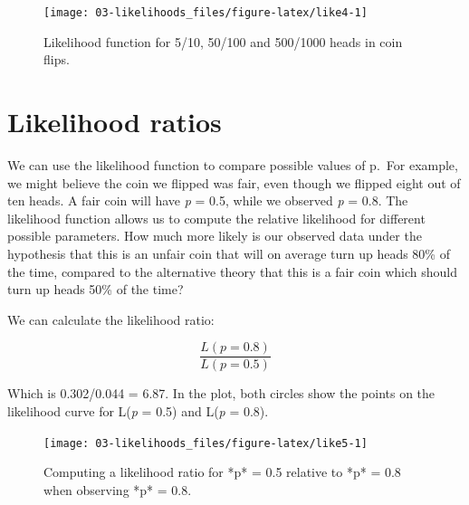 \documentclass[
  oneside]{book}
\begin{document}
\begin{figure}

{\centering \texttt{[image: 03-likelihoods\_files/figure-latex/like4-1]} 

}

\caption{Likelihood function for 5/10, 50/100 and 500/1000 heads in coin flips.}\label{fig:like4}
\end{figure}

\hypertarget{likelihood-ratios}{%
\section{Likelihood ratios}\label{likelihood-ratios}}

We can use the likelihood function to compare possible values of p.~For example, we might believe the coin we flipped was fair, even though we flipped eight out of ten heads. A fair coin will have \emph{p} = 0.5, while we observed \emph{p} = 0.8. The likelihood function allows us to compute the relative likelihood for different possible parameters. How much more likely is our observed data under the hypothesis that this is an unfair coin that will on average turn up heads 80\% of the time, compared to the alternative theory that this is a fair coin which should turn up heads 50\% of the time?

We can calculate the likelihood ratio:

\[
\frac{L(p = 0.8)}{L(p = 0.5)}
\]

Which is 0.302/0.044 = 6.87. In the plot, both circles show the points on
the likelihood curve for L(\emph{p} = 0.5) and L(\emph{p} = 0.8).

\begin{figure}

{\centering \texttt{[image: 03-likelihoods\_files/figure-latex/like5-1]} 

}

\caption{Computing a likelihood ratio for *p* = 0.5 relative to *p* = 0.8 when observing *p* = 0.8.}\label{fig:like5}
\end{figure}
\end{document}
